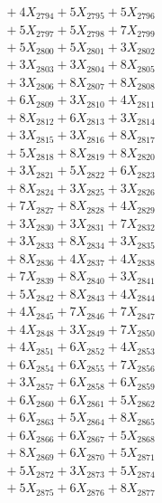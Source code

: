 \documentclass[a4paper,10pt]{article}
\begin{document}
{\begin{align}
&\;  + 4 X_{2794} + 5 X_{2795} + 5 X_{2796} \\[0.3ex]
&\;  + 5 X_{2797} + 5 X_{2798} + 7 X_{2799} \\[0.5ex]\allowbreak
&\;  + 5 X_{2800} + 5 X_{2801} + 3 X_{2802} \\[0.3ex]
&\;  + 3 X_{2803} + 3 X_{2804} + 8 X_{2805} \\[0.3ex]
&\;  + 3 X_{2806} + 8 X_{2807} + 8 X_{2808} \\[0.3ex]
&\;  + 6 X_{2809} + 3 X_{2810} + 4 X_{2811} \\[0.3ex]
&\;  + 8 X_{2812} + 6 X_{2813} + 3 X_{2814} \\[0.3ex]
&\;  + 3 X_{2815} + 3 X_{2816} + 8 X_{2817} \\[0.3ex]
&\;  + 5 X_{2818} + 8 X_{2819} + 8 X_{2820} \\[0.3ex]
&\;  + 3 X_{2821} + 5 X_{2822} + 6 X_{2823} \\[0.3ex]
&\;  + 8 X_{2824} + 3 X_{2825} + 3 X_{2826} \\[0.3ex]
&\;  + 7 X_{2827} + 8 X_{2828} + 4 X_{2829} \\[0.5ex]\allowbreak
&\;  + 3 X_{2830} + 3 X_{2831} + 7 X_{2832} \\[0.3ex]
&\;  + 3 X_{2833} + 8 X_{2834} + 3 X_{2835} \\[0.3ex]
&\;  + 8 X_{2836} + 4 X_{2837} + 4 X_{2838} \\[0.3ex]
&\;  + 7 X_{2839} + 8 X_{2840} + 3 X_{2841} \\[0.3ex]
&\;  + 5 X_{2842} + 8 X_{2843} + 4 X_{2844} \\[0.3ex]
&\;  + 4 X_{2845} + 7 X_{2846} + 7 X_{2847} \\[0.3ex]
&\;  + 4 X_{2848} + 3 X_{2849} + 7 X_{2850} \\[0.3ex]
&\;  + 4 X_{2851} + 6 X_{2852} + 4 X_{2853} \\[0.3ex]
&\;  + 6 X_{2854} + 6 X_{2855} + 7 X_{2856} \\[0.3ex]
&\;  + 3 X_{2857} + 6 X_{2858} + 6 X_{2859} \\[0.5ex]\allowbreak
&\;  + 6 X_{2860} + 6 X_{2861} + 5 X_{2862} \\[0.3ex]
&\;  + 6 X_{2863} + 5 X_{2864} + 8 X_{2865} \\[0.3ex]
&\;  + 6 X_{2866} + 6 X_{2867} + 5 X_{2868} \\[0.3ex]
&\;  + 8 X_{2869} + 6 X_{2870} + 5 X_{2871} \\[0.3ex]
&\;  + 5 X_{2872} + 3 X_{2873} + 5 X_{2874} \\[0.3ex]
&\;  + 5 X_{2875} + 6 X_{2876} + 8 X_{2877} \\[0.3ex]

\end{align}}
\end{document}
